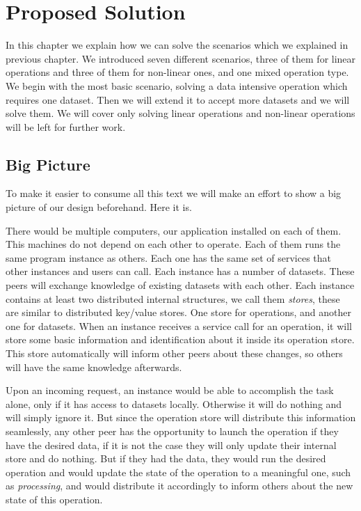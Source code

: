 \chapter{Proposed Solution}
\label{cha:proposal}
In this chapter we explain how we can solve the scenarios which we explained in previous chapter.
We introduced seven different scenarios, three of them for linear operations and three of them for non-linear
ones, and one mixed operation type. We begin with the most basic scenario, solving a data intensive operation
which requires one dataset. Then we will extend it to accept more datasets and we will solve them. We will
cover only solving linear operations and non-linear operations will be left for further work.

\section{Big Picture}
To make it easier to consume all this text we will make an effort to show a big picture of our design beforehand. Here it is.

There would be multiple computers, our application installed on each of them. This machines do not depend on each
other to operate. Each of them runs the same program instance as others. Each one has the same set of services that
other instances and users can call. Each instance has a number of datasets. These peers will exchange knowledge of
existing datasets with each other. Each instance contains at least two distributed internal structures,
we call them \textit{stores}, these are similar to distributed key/value stores.
One store for operations, and another one for datasets. When an instance receives a service call for an operation, it
will store some basic information and identification about it inside its operation store. This store automatically will
inform other peers about these changes, so others will have the same knowledge afterwards.

Upon an incoming request, an instance would be able to accomplish the task alone, only if it has access to datasets locally.
Otherwise it will do nothing and will simply ignore it. But since the operation store will distribute this information
seamlessly, any other peer has the opportunity to launch the operation if they have the desired data, if it is not the case
they will only update their internal store and do nothing. But if they had the data, they would run the desired operation
and would update the state of the operation to a meaningful one, such as \textit{processing}, and would distribute it
accordingly to inform others about the new state of this operation.

